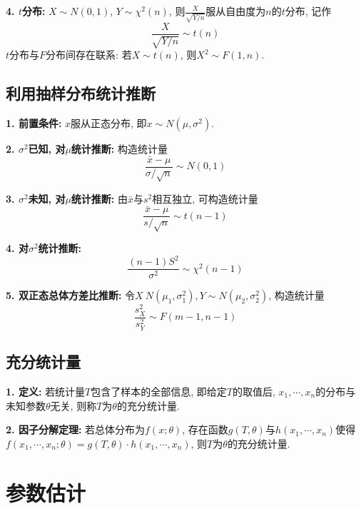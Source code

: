 \textbf{4. $t$分布: }$X \sim N(0,1)$, $Y \sim \chi^2(n)$, 则$\frac{X}{\sqrt{Y/n}}$服从自由度为$n$的$t$分布, 记作
\begin{equation*}
    \frac{X}{\sqrt{Y/n}} \sim t(n)
\end{equation*}
$t$分布与$F$分布间存在联系: 若$X \sim t(n)$,  则$X^2 \sim F(1,n)$.

\subsection{利用抽样分布统计推断}

\textbf{1. 前置条件: }$x$服从正态分布, 即$x \sim N(\mu, \sigma^2)$.

\textbf{2. $\sigma^2$已知, 对$\mu$统计推断: }构造统计量
\begin{equation*}
    \frac{\bar{x}-\mu}{\sigma/\sqrt{n}} \sim N(0,1)
\end{equation*}


\textbf{3. $\sigma^2$未知, 对$\mu$统计推断: }由$\bar{x}$与$s^2$相互独立, 可构造统计量
\begin{equation*}
    \frac{\bar{x}-\mu}{s/\sqrt{n}} \sim t(n-1)
\end{equation*}

\textbf{4. 对$\sigma^2$统计推断:}
\begin{equation*}
    \frac{(n-1)S^2}{\sigma^2} \sim \chi^2(n-1)
\end{equation*}

\textbf{5. 双正态总体方差比推断: }令$X~N(\mu_1,\sigma_1^2), Y\sim N(\mu_2,\sigma_2^2)$, 构造统计量
\begin{equation*}
    \frac{s_X^2}{s_Y^2} \sim F(m-1,n-1)
\end{equation*}

\subsection{充分统计量}

\textbf{1. 定义: }若统计量$T$包含了样本的全部信息, 即给定$T$的取值后, $x_1,\cdots, x_n$的分布与未知参数$\theta$无关, 则称$T$为$\theta$的充分统计量.

\textbf{2. 因子分解定理: }若总体分布为$f(x;\theta)$, 存在函数$g(T,\theta)$与$h(x_1,\cdots,x_n)$使得$f(x_1,\cdots,x_n;\theta)=g(T,\theta)\cdot h(x_1,\cdots,x_n)$, 则$T$为$\theta$的充分统计量.

\section{参数估计}

